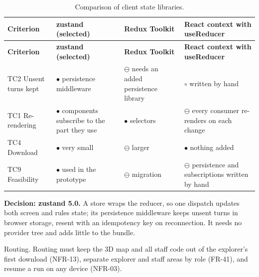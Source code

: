 {\small
\begin{longtable}{|>{\raggedright\arraybackslash}p{}|>{\raggedright\arraybackslash}p{}|>{\raggedright\arraybackslash}p{}|>{\raggedright\arraybackslash}p{}|}
\caption{Comparison of client state libraries.} \\
\hline
\textbf{Criterion} & \textbf{zustand (selected)} & \textbf{Redux Toolkit\cite{r174}} & \textbf{React context with useReducer} \\ \hline
\endfirsthead
\hline
\textbf{Criterion} & \textbf{zustand (selected)} & \textbf{Redux Toolkit\cite{r174}} & \textbf{React context with useReducer} \\ \hline
\endhead
TC2 Unsent turns kept & $\bullet$ persistence middleware\cite{r142} & $\ominus$ needs an added persistence library & $\circ$ written by hand \\ \hline
TC1 Re-rendering & $\bullet$ components subscribe to the part they use & $\bullet$ selectors & $\ominus$ every consumer re-renders on each change \\ \hline
TC4 Download & $\bullet$ very small & $\ominus$ larger & $\bullet$ nothing added \\ \hline
TC9 Feasibility & $\bullet$ used in the prototype & $\ominus$ migration & $\ominus$ persistence and subscriptions written by hand \\ \hline
\end{longtable}
}

\textbf{Decision: zustand 5.0.} A store wraps the reducer, so one dispatch updates both screen and rules state; its persistence middleware keeps unsent turns in browser storage, resent with an idempotency key on reconnection\cite{r142}. It needs no provider tree and adds little to the bundle.

Routing. Routing must keep the 3D map and all staff code out of the explorer's first download (NFR-13), separate explorer and staff areas by role (FR-41), and resume a run on any device (NFR-03).

